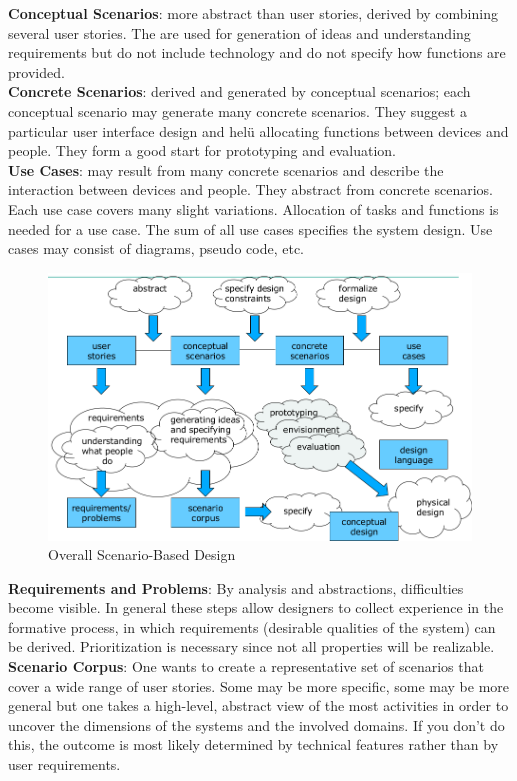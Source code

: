\textbf{Conceptual Scenarios}: more abstract than user stories, derived by combining several user stories. The are used for generation of ideas and understanding requirements but do not include technology and do not specify how functions are provided.\\

\textbf{Concrete Scenarios}: derived and generated by conceptual scenarios; each conceptual scenario may generate many concrete scenarios. They suggest a particular user interface design and helü allocating functions between devices and people. They form a good start for prototyping and evaluation. \\

\textbf{Use Cases}: may result from many concrete scenarios and describe the interaction between devices and people. They abstract from concrete scenarios. Each use case covers many slight variations. Allocation of tasks and functions is needed for a use case. The sum of all use cases specifies the system design. Use cases may consist of diagrams, pseudo code, etc.

\begin{figure}[h!]
	\centering
	\includegraphics[width=.8\textwidth]{img/ch06_scene2.png}
	\caption{Overall Scenario-Based Design}
	\label{scen2}
\end{figure}

\textbf{Requirements and Problems}: By analysis and abstractions, difficulties become visible. In general these steps allow designers to collect experience in the formative process, in which requirements (desirable qualities of the system) can be derived. Prioritization is necessary since not all properties will be realizable.\\

\textbf{Scenario Corpus}: One wants to create a representative set of scenarios that cover a wide range of user stories. Some may be more specific, some may be more general but one takes a high-level, abstract view of the most activities in order to uncover the dimensions of the systems and the involved domains. If you don't do this, the outcome is most likely determined by technical features rather than by user requirements.\\

